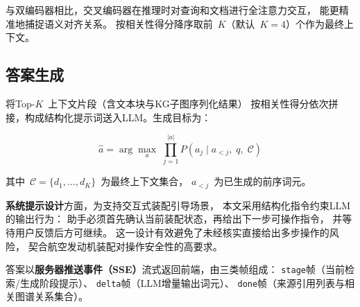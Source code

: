 与双编码器相比，交叉编码器在推理时对查询和文档进行全注意力交互，
能更精准地捕捉语义对齐关系。
按相关性得分降序取前~$K$（默认~$K=4$）个作为最终上下文。

\subsection{答案生成}
\label{sec:generation}

将Top-$K$~上下文片段（含文本块与KG子图序列化结果）
按相关性得分依次拼接，构成结构化提示词送入LLM。生成目标为：

\begin{equation}
  \hat{a} = \arg\max_{a}\;
  \prod_{j=1}^{|a|}
  P\!\left(a_j \mid a_{<j},\; q,\; \mathcal{C}\right)
  \label{eq:generation}
\end{equation}

其中~$\mathcal{C} = \{d_1, \ldots, d_K\}$~为最终上下文集合，
$a_{<j}$~为已生成的前序词元。

\textbf{系统提示设计}方面，为支持交互式装配引导场景，
本文采用结构化指令约束LLM的输出行为：
助手必须首先确认当前装配状态，再给出下一步可操作指令，
并等待用户反馈后方可继续。
这一设计有效避免了未经核实直接给出多步操作的风险，
契合航空发动机装配对操作安全性的高要求。

答案以\textbf{服务器推送事件（SSE）}流式返回前端，由三类帧组成：
\texttt{stage}帧（当前检索/生成阶段提示）、
\texttt{delta}帧（LLM增量输出词元）、
\texttt{done}帧（来源引用列表与相关图谱关系集合）。
